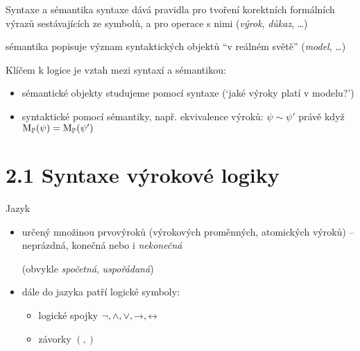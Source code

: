 \documentclass{beamer}
\begin{document}
\begin{frame}{Syntaxe a sémantika}
    \alert{syntaxe} dává pravidla pro tvoření korektních formálních výrazů sestávajících ze symbolů, a pro operace s nimi (\emph{výrok}, \emph{důkaz}, \dots)
    
    \alert{sémantika} popisuje význam syntaktických objektů ``v reálném světě'' (\emph{model}, \dots)
        
    Klíčem k logice je \alert{vztah mezi syntaxí a sémantikou}:
    \begin{itemize}
        \item sémantické objekty studujeme pomocí syntaxe (`jaké výroky platí v modelu?')
        \item syntaktické pomocí sémantiky, např. ekvivalence výroků: $\psi \sim \psi'$ právě když $\operatorname{M}_\mathbb P(\psi)=\operatorname{M}_\mathbb P(\psi')$
    \end{itemize}
\end{frame}


\section{2.1 Syntaxe výrokové logiky}


\begin{frame}{Jazyk}
    \begin{itemize}
        \item určený množinou \alert{prvovýroků} (\alert{výrokových proměnných}, \alert{atomických výroků}) -- neprázdná, konečná nebo i \emph{nekonečná}
    
        \medskip
        \medskip
        
        (obvykle \emph{spočetná}, \emph{uspořádaná})
    
        \medskip
        \item dále do jazyka patří \alert{logické symboly}:
        \begin{itemize}
            \item logické spojky $\neg,{\land},{\lor}, {\mathbin{\rightarrow}}, {\mathbin{\leftrightarrow}}$
            \item závorky $(,)$
        \end{itemize}
    \end{itemize}
\end{frame}
\end{document}

